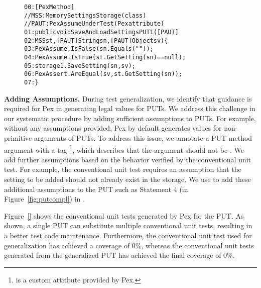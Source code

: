 \begin{figure}[t]
\begin{CodeOut}
\begin{alltt}
00:[PexMethod]
\hspace*{0.3in}//MSS: MemorySettingsStorage (class)
\hspace*{0.3in}//PAUT: PexAssumeUnderTest	(Pex attribute)
01:public void SaveAndLoadSettingsPUT1([PAUT]
02:\hspace*{0.1in}MSS st, [PAUT]String sn, [PAUT]Object sv) \{
03:\hspace*{0.2in}PexAssume.IsFalse(sn.Equals(""));
04:\hspace*{0.2in}PexAssume.IsTrue(st.GetSetting(sn) == null);
05:\hspace*{0.2in}storage1.SaveSetting(sn, sv);
06:\hspace*{0.2in}PexAssert.AreEqual(sv, st.GetSetting(sn));
07:\}
\end{alltt}
\end{CodeOut}
\end{figure}

\textbf{Adding Assumptions.} During test generalization, we identify that guidance is required for Pex in generating legal values for PUTs. We address this challenge in our systematic procedure by adding sufficient assumptions to PUTs. For example, without any assumptions provided, Pex by default generates  values for non-primitive arguments of PUTs. To address this issue, we annotate a PUT method argument with a tag \footnote{ is a custom attribute provided by Pex.}, which describes that the argument should not be . We add further assumptions based on the behavior verified by the conventional unit test. For example, the conventional unit test requires an assumption that the setting to be added should not already exist in the storage. We use  to add these additional assumptions to the PUT such as Statement 4 (in Figure~\ref{fig:putcompl}) in .

Figure~\ref{} shows the conventional unit tests generated by Pex for the PUT. As shown, a single PUT can substitute multiple conventional unit tests, resulting in a better test code maintenance. Furthermore, the conventional unit test used for generalization has achieved a coverage of $0$\%, whereas the conventional unit tests generated from the generalized PUT has achieved the final coverage of $0$\%. 

